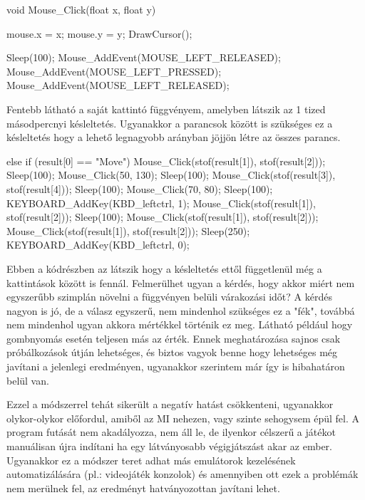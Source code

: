 \begin{cpp}
void Mouse_Click(float x, float y) {
    mouse.x = x;
    mouse.y = y;
    DrawCursor();
    
    Sleep(100);
    Mouse_AddEvent(MOUSE_LEFT_RELEASED);
    Mouse_AddEvent(MOUSE_LEFT_PRESSED);
    Mouse_AddEvent(MOUSE_LEFT_RELEASED);   
}
\end{cpp}

Fentebb látható a saját kattintó függvényem, amelyben látszik az 1 tized másodpercnyi késleltetés. Ugyanakkor a parancsok között is szükséges ez a késleltetés hogy a lehető legnagyobb arányban jöjjön létre az összes parancs.

\begin{cpp}
else if (result[0] == "Move")
{
    Mouse_Click(stof(result[1]), stof(result[2]));
    Sleep(100);
    Mouse_Click(50, 130);
    Sleep(100);
    Mouse_Click(stof(result[3]), stof(result[4]));
    Sleep(100);
    Mouse_Click(70, 80);
    Sleep(100);
    KEYBOARD_AddKey(KBD_leftctrl, 1);	
    Mouse_Click(stof(result[1]), stof(result[2]));
    Sleep(100);
    Mouse_Click(stof(result[1]), stof(result[2]));
    Mouse_Click(stof(result[1]), stof(result[2]));
    Sleep(250);
    KEYBOARD_AddKey(KBD_leftctrl, 0);
}
\end{cpp}

Ebben a kódrészben az látszik hogy a késleltetés ettől függetlenül még a kattintások között is fennál. Felmerülhet ugyan a kérdés, hogy akkor miért nem egyszerűbb szimplán növelni a függvényen belüli várakozási időt? A kérdés nagyon is jó, de a válasz egyszerű, nem mindenhol szükséges ez a "fék", továbbá nem mindenhol ugyan akkora mértékkel történik ez meg. Látható például hogy gombnyomás esetén teljesen más az érték. Ennek meghatározása sajnos csak próbálkozások útján lehetséges, és biztos vagyok benne hogy lehetséges még javítani a jelenlegi eredményen, ugyanakkor szerintem már így is hibahatáron belül van.

Ezzel a módszerrel tehát sikerült a negatív hatást csökkenteni, ugyanakkor olykor-olykor előfordul, amiből az MI nehezen, vagy szinte sehogysem épül fel. A program futását nem akadályozza, nem áll le, de ilyenkor célszerű a játékot manuálisan újra indítani ha egy látványosabb végigjátszást akar az ember. Ugyanakkor ez a módszer teret adhat más emulátorok kezelésének automatizálására (pl.: videojáték konzolok) és amennyiben ott ezek a problémák nem merülnek fel, az eredményt hatványozottan javítani lehet.